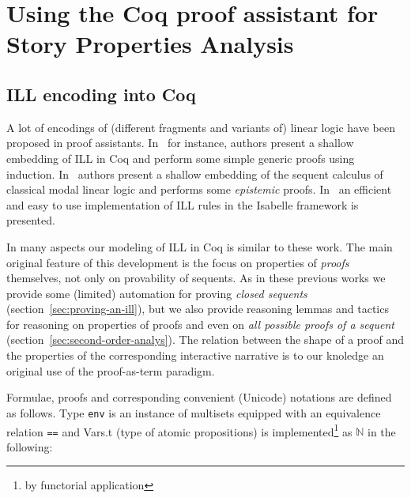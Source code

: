 \documentclass[runningheads,a4paper]{llncs}
\newcommand{\N}{\mathbb{N}}
\begin{document}
\section{Using the Coq proof assistant for Story Properties Analysis}
\subsection{ILL encoding into Coq}
\label{sec:ill-encoding-into}

A lot of encodings of (different fragments and variants of) linear
logic have been proposed in proof assistants. In~\cite{Power99} for
instance, authors present a shallow embedding of ILL in Coq and
perform some simple generic proofs using induction.
In~\cite{Sadrzadeh03modallinear} authors present a shallow embedding
of the sequent calculus of classical modal linear logic and performs
some \emph{epistemic} proofs. In~\cite{Kalvala95mechanizinglinear} an
efficient and easy to use implementation of ILL rules in the Isabelle
framework is presented.

In many aspects our modeling of ILL in Coq is similar to these work.
The main original feature of this development is the focus on
properties of \emph{proofs} themselves, not only on provability of
sequents. As in these previous works we provide some (limited)
automation for proving \emph{closed sequents}
(section~\ref{sec:proving-an-ill}), but we also provide reasoning
lemmas and tactics for reasoning on properties of proofs and even on
\emph{all possible proofs of a sequent}
(section~\ref{sec:second-order-analys}). The relation between the
shape of a proof and the properties of the corresponding interactive
narrative is to our knoledge an original use of the proof-as-term
paradigm.


Formulae, proofs and corresponding convenient (Unicode) notations are
defined as follows. Type \texttt{env} is an instance of multisets
equipped with an equivalence relation \texttt{==} and Vars.t (type of
atomic propositions) is implemented\footnote{by functorial
  application} as $\N$ in the following:
\end{document}
